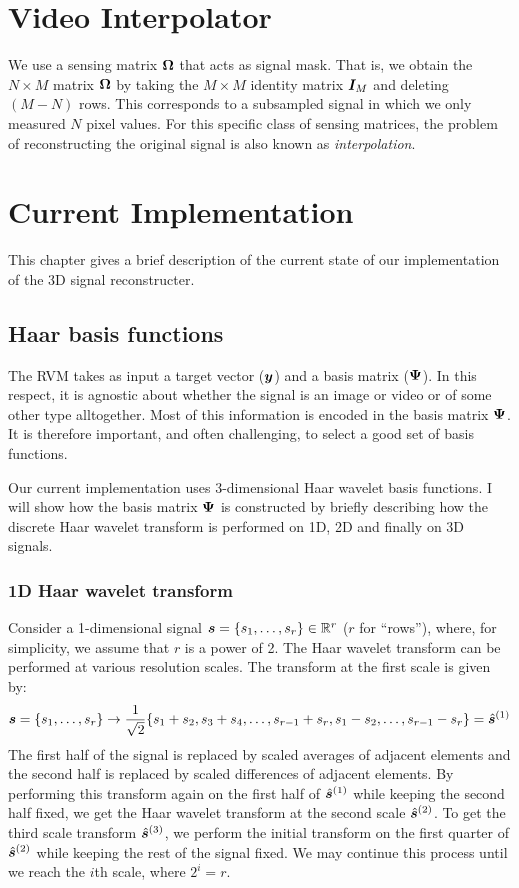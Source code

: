 \chapter{Video Interpolator}
We use a sensing matrix $\boldsymbol\Omega$ that acts as signal mask. That is, we obtain the $N\times M$ matrix $\boldsymbol\Omega$ by taking the $M\times M$ identity matrix $\boldsymbol I_M$ and deleting $(M-N)$ rows. This corresponds to a subsampled signal in which we only measured $N$ pixel values. For this specific class of sensing matrices, the problem of reconstructing the original signal is also known as \emph{interpolation}.

\chapter{Current Implementation}
This chapter gives a brief description of the current state of our implementation of the 3D signal reconstructer.

\section{Haar basis functions}
The RVM takes as input a target vector ($\boldsymbol y$) and a basis matrix ($\boldsymbol \Psi$). 
In this respect, it is agnostic about whether the signal is an image or video or of some other type alltogether.
Most of this information is encoded in the basis matrix $\boldsymbol \Psi$.
It is therefore important, and often challenging, to select a good set of basis functions.

Our current implementation uses 3-dimensional Haar wavelet basis functions.
I will show how the basis matrix $\boldsymbol\Psi$ is constructed by briefly describing how the discrete Haar wavelet transform is performed on 1D, 2D and finally on 3D signals.

\subsection{1D Haar wavelet transform}
Consider a 1-dimensional signal $\boldsymbol s = \{s_1,\dots,s_r\} \in \mathbb{R}^r$ ($r$ for ``rows''), where, for simplicity, we assume that $r$ is a power of 2.
The Haar wavelet transform can be performed at various resolution scales.
The transform at the first scale is given by:
\begin{equation*}
\boldsymbol s = \{s_1,\dots,s_r\}\to \frac{1}{\sqrt{2}}\{s_1+s_2,s_3+s_4,\dots,s_{r-1}+s_r,s_1-s_2,\dots,s_{r-1}-s_r\}=\hat{\boldsymbol s}^{(1)}
\end{equation*}
The first half of the signal is replaced by scaled averages of adjacent elements and the second half is replaced by scaled differences of adjacent elements.
By performing this transform again on the first half of $\hat{\boldsymbol s}^{(1)}$ while keeping the second half fixed, we get the Haar wavelet transform at the second scale $\hat{\boldsymbol s}^{(2)}$. 
To get the third scale transform $\hat{\boldsymbol s}^{(3)}$, we perform the initial transform on the first quarter of $\hat{\boldsymbol s}^{(2)}$ while keeping the rest of the signal fixed.
We may continue this process until we reach the $i$th scale, where $2^i = r$.

